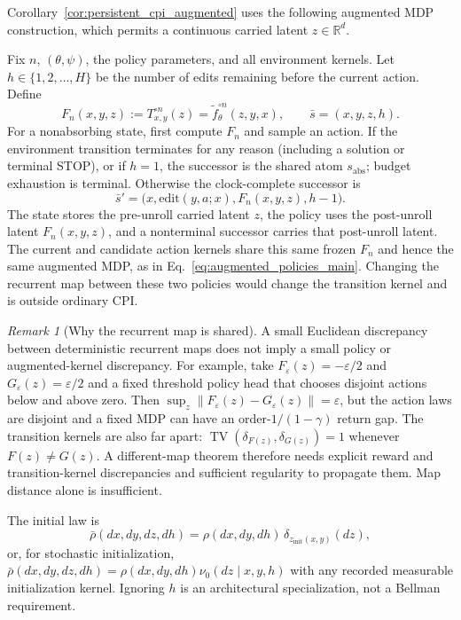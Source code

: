 \documentclass{article}
\theoremstyle{plain}
\theoremstyle{definition}
\theoremstyle{remark}
\newtheorem{remark}[theorem]{Remark}
\begin{document}
Corollary~\ref{cor:persistent_cpi_augmented} uses the following augmented
MDP construction, which permits a continuous carried latent $z\in\mathbb R^d$.

Fix $n$, $(\theta,\psi)$, the policy parameters, and all environment kernels. Let $h\in\{1,2,\ldots,H\}$ be the number of edits remaining before the current action. Define
\begin{equation}
F_n(x,y,z):=T_{x,y}^{\circ n}(z)=\widetilde f_\theta^{\circ n}(z,y,x),
\qquad \bar s=(x,y,z,h).
\label{eq:persistent_hn}
\end{equation}
For a nonabsorbing state, first compute $F_n$ and sample an action. If the environment transition terminates for any reason (including a solution or terminal STOP), or if $h=1$, the successor is the shared atom $s_{\mathrm{abs}}$; budget exhaustion is terminal. Otherwise the clock-complete successor is
\[
\bar s'=\bigl(x,\mathrm{edit}(y,a;x),F_n(x,y,z),h-1\bigr).
\]
The state stores the pre-unroll carried latent $z$, the policy uses the post-unroll latent $F_n(x,y,z)$, and a nonterminal successor carries that post-unroll latent.
The current and candidate action kernels share this same frozen $F_n$ and hence the same augmented MDP, as in Eq.~\eqref{eq:augmented_policies_main}.
Changing the recurrent map between these two policies would change the transition kernel and is outside ordinary CPI.
\begin{remark}[Why the recurrent map is shared]
\label{rem:shared_map_impossibility}
A small Euclidean discrepancy between deterministic recurrent maps does not
imply a small policy or augmented-kernel discrepancy. For example, take
$F_\varepsilon(z)=-\varepsilon/2$ and
$G_\varepsilon(z)=\varepsilon/2$ and a fixed threshold policy head that
chooses disjoint actions below and above zero. Then
$\sup_z\|F_\varepsilon(z)-G_\varepsilon(z)\|=\varepsilon$, but the action
laws are disjoint and a fixed MDP can have an order-$1/(1-\gamma)$ return
gap. The transition kernels are also far apart:
$\operatorname{TV}(\delta_{F(z)},\delta_{G(z)})=1$ whenever
$F(z)\ne G(z)$. A different-map theorem therefore needs explicit reward and
transition-kernel discrepancies and sufficient regularity to propagate them.
Map distance alone is insufficient.
\end{remark}
The initial law is
\begin{equation}
\bar\rho(dx,dy,dz,dh)=\rho(dx,dy,dh)\,\delta_{z_{\mathrm{init}}(x,y)}(dz),
\label{eq:persistent_initial_law}
\end{equation}
or, for stochastic initialization,
$\bar\rho(dx,dy,dz,dh)=\rho(dx,dy,dh)\nu_0(dz\mid x,y,h)$ with any recorded
measurable initialization kernel. Ignoring $h$ is an architectural
specialization, not a Bellman requirement.
\end{document}
